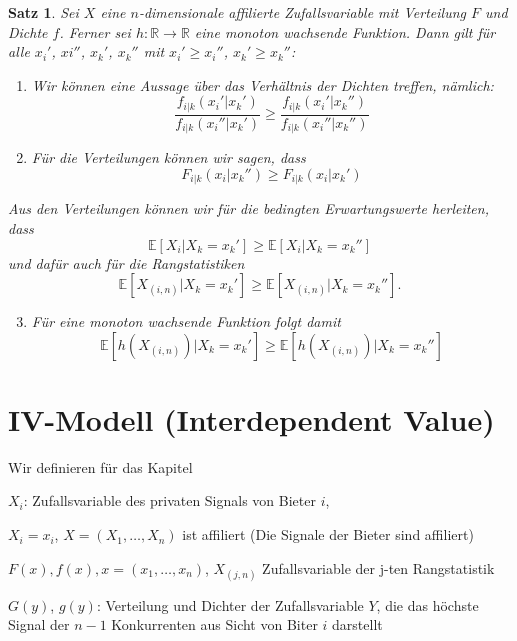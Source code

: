 \documentclass[12pt]{extreport} %
\theoremstyle{named}
\theoremstyle{nnamed}
\theoremstyle{itshape}
\newtheorem{satz}[unnamedtheorem]{Satz}
\theoremstyle{normal}
\begin{document}
\begin{satz}
	Sei $X$ eine $n$-dimensionale affilierte Zufallsvariable mit Verteilung $F$ und Dichte $f$. Ferner sei $h \colon \mathbb{R} \rightarrow \mathbb{R}$ eine monoton wachsende Funktion. Dann gilt für alle $x_{i}'$, $x{i}''$, $x_{k}'$, $x_{k}''$ mit $x_{i}' \geq x_{i}''$, $x_{k}' \geq x_{k}''$:
	\begin{enumerate}
		\item Wir können eine Aussage über das Verhältnis der Dichten treffen, nämlich:
			$$\frac{f_{i|k}(x_{i}'|x_{k}')}{f_{i|k}(x_{i}''|x_{k}')} \geq \frac{f_{i|k}(x_{i}'|x_{k}'')}{f_{i|k}(x_{i}''|x_{k}'')}$$
		\item Für die Verteilungen können wir sagen, dass
			$$ F_{i|k}(x_{i}|x_{k}'') \geq F_{i|k}(x_{i}|x_{k}') $$
	\end{enumerate}	

	Aus den Verteilungen können wir für die bedingten Erwartungswerte herleiten, dass
		$$ \mathbb{E}\left[ X_{i} \big| X_{k} = x_{k}' \right] \geq \mathbb{E}\left[ X_{i} \big| X_{k} = x_{k}'' \right] $$
	und dafür auch für die Rangstatistiken
		$$ \mathbb{E}\left[ X_{(i,n)} \big| X_{k} = x_{k}' \right] \geq \mathbb{E}\left[ X_{(i,n)} \big| X_{k} = x_{k}'' \right]. $$
	\begin{enumerate} \setcounter{enumi}{2}
		\item \textit{Für eine monoton wachsende Funktion folgt damit}
		 $$\mathbb{E}\left[ h\left(X_{(i,n)} \right) \big| X_{k} = x_{k}' \right] \geq \mathbb{E}\left[ h\left(X_{(i,n)} \right)\big| X_{k} = x_{k}'' \right]$$
	\end{enumerate}
\end{satz}

\section{IV-Modell (Interdependent Value)}

Wir definieren für das Kapitel

\begin{description}
	\item $X_{i}$: Zufallsvariable des privaten Signals von Bieter $i$,
	\item $X_{i} = x_{i}$, $X = (X_{1}, \dotsc, X_{n})$ ist affiliert (Die Signale der Bieter sind affiliert)
	\item $F(x), f(x), x = (x_1, \dotsc, x_n)$, $X_{(j,n)}$ Zufallsvariable der j-ten Rangstatistik
	\item $G(y)$, $g(y)$: Verteilung und Dichter der Zufallsvariable $Y$, die das höchste Signal der $n-1$ Konkurrenten aus Sicht von Biter $i$ darstellt
\end{description}
\end{document}
